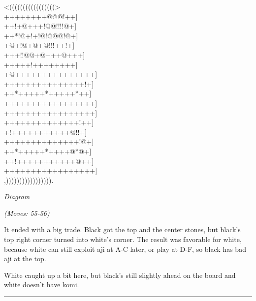 \documentclass[letterpaper,12pt]{memoir}
\newcounter{GoFigure}[part]
\newcommand{\gofigure}{%
 \stepcounter{GoFigure}
 \centerline{\textit{Diagram \arabic{GoFigure}}}
}
\newcommand{\subtext}[1]{\centerline{\textit{#1}}}
\begin{document}
\begin{minipage}[t]{240pt}
\label{Fujisawa-Hosai-vs-Go-Seigen-19430225:0:mainmove-55}
{\gnos
<(((((((((((((((((>\\
++++++++@@@!++]\\
++!+@+++!@@!!!!@+]\\
++*!@+!+!@!@@@!@+]\\
+@+!@+@+@!!!++!+]\\
+++!!@@+@+++@+++]\\
+++++!++++++++]\\
+@+++++++++++++++]\\
+++++++++++++++!+]\\
++*+++++*+++++*++]\\
+++++++++++++++++]\\
+++++++++++++++++]\\
++++++++++++++!++]\\
+!+++++++++++@!!+]\\
++++++++++++++!@+]\\
++*+++++*++++@*@+]\\
++!+++++++++++@++]\\
+++++++++++++++++]\\
,))))))))))))))))).\\
}
\gofigure
\subtext{(Moves: 55-56)}
\end{minipage}
\begin{minipage}[t]{268.19999999999993pt}
\setlength{\parskip}{0.5em}
It ended with a big trade. Black got the top and the center stones, but black's top right corner turned into white's corner. The result was favorable for white, because white can still exploit aji at A-C later, or play at D-F, so black has bad aji at the top.

White caught up a bit here, but black's still slightly ahead on the board and white doesn't have komi.


\end{minipage}
\vfill

\rule{\textwidth}{0.5pt}
\end{document}
